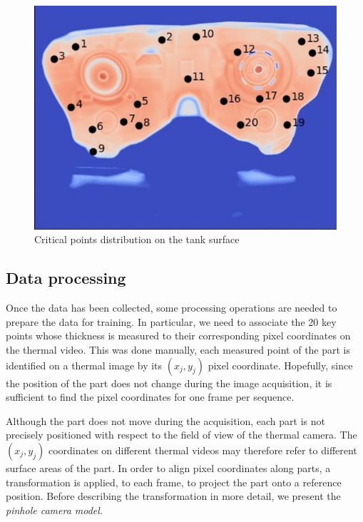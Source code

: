 \begin{figure}
\centering
\includegraphics[scale=1]{images/chapter_4/critical_points.jpg}
\caption{Critical points distribution on the tank surface}
\label{fig:critical_points}
\end{figure}

\subsection{Data processing}

Once the data has been collected, some processing operations are needed to prepare the data for training. In particular, we need to associate the 20 key points whose thickness is measured to their corresponding pixel coordinates on the thermal video. This was done manually, each measured point of the part is identified on a thermal image by its $(x_j, y_j)$ pixel coordinate. Hopefully, since the position of the part does not change during the image acquisition, it is sufficient to find the pixel coordinates for one frame per sequence. 

Although the part does not move during the acquisition, each part is not precisely positioned with respect to the field of view of the thermal camera. The  $(x_j, y_j)$ coordinates on different thermal videos may therefore refer to different surface areas of the part. In order to align pixel coordinates along parts, a transformation is applied, to each frame, to project the part onto a reference position. Before describing the transformation in more detail, we present the \textit{pinhole camera model}. 

